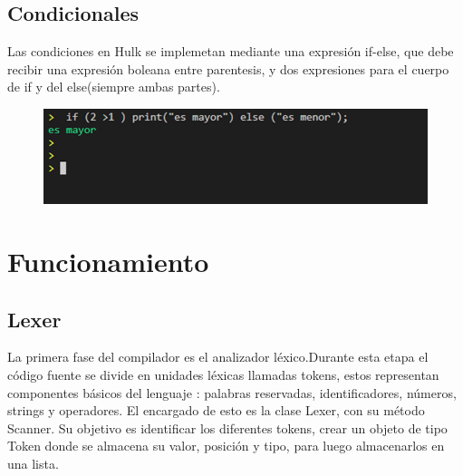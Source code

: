 \documentclass[12pt]{article}
\begin{document}
	\subsection{Condicionales}
	Las condiciones en Hulk se implemetan mediante una expresión if-else, que debe recibir una expresión boleana entre parentesis, y dos expresiones para el cuerpo de if y del else(siempre ambas partes).
	\begin{center}
		\begin{figure}[h!]
			\centering
			\includegraphics[scale=0.4]{imagen7}
			
		\end{figure}
	\end{center}
	
	\section{\Huge {Funcionamiento}}
	\subsection{ \Large{Lexer}}
	La primera fase del compilador es el analizador léxico.Durante esta etapa el código fuente  se divide en unidades léxicas llamadas tokens, estos representan componentes básicos del lenguaje : palabras reservadas, identificadores, números, strings y operadores. El encargado  de esto es la clase Lexer, con su método Scanner. Su objetivo es identificar los diferentes tokens, crear un objeto de tipo Token donde se almacena su valor, posición y tipo, para luego almacenarlos en una lista.  \\
\end{document}

